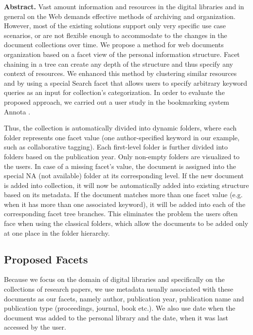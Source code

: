 \documentclass[12pt]{article}
\begin{document}
  \textbf{Abstract.} Vast amount information and resources in the digital libraries and in general on the Web demands effective methods of archiving and organization. However, most of the existing solutions support only very specific use case scenarios, or are not flexible enough to accommodate to the changes in the document collections over time. We propose a method for web documents organization based on a facet view of the personal information structure. Facet chaining in a tree can create any depth of the structure and thus specify any context of resources. We enhanced this method by clustering similar resources and by using a special Search facet that allows users to specify arbitrary keyword queries as an input for collection’s categorization. In order to evaluate the proposed approach, we carried out a user study in the bookmarking system Annota .
 
 
 
 Thus, the collection is automatically divided into dynamic folders, where each folder represents one facet value (one author-specified keyword in our example, such as collaborative tagging). Each first-level folder is further divided into folders based on the publication year. Only non-empty folders are visualized to the users. In case of a missing facet’s value, the document is assigned into the special NA (not available) folder at its corresponding level. If the new document is added into collection, it will now be automatically added into existing structure based on its metadata. If the document matches more than one facet value (e.g. when it has more than one associated keyword), it will be added into each of the corresponding facet tree branches. This eliminates the problem the users often face when using the classical folders, which allow the documents to be added only at one place in the folder hierarchy.
 
    \subsection{Proposed Facets}

Because we focus on the domain of digital libraries and specifically on the collections of research papers, we use metadata usually associated with these documents as our facets, namely author, publication year, publication name and publication type (proceedings, journal, book etc.). We also use date when the document was added to the personal library and the date, when it was last accessed by the user.
\end{document}
